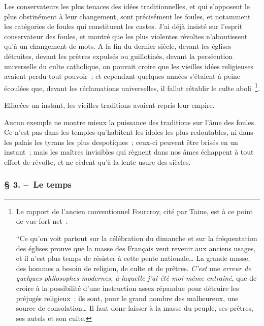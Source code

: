 \documentclass[french,twoside]{book} %
\begin{document}
Les conservateurs les plus tenaces des idées traditionnelles, et qui s’opposent le plus obstinément à leur changement, sont précisément les foules, et notamment les catégories de foules qui constituent les castes. J’ai déjà insisté sur l’esprit conservateur des foules, et montré que les plus violentes révoltes n’aboutissent qu’à un changement de mots. A la fin du dernier siècle, devant les églises détruites, devant les prêtres expulsés ou guillotinés, devant la persécution universelle du culte catholique, on pouvait croire que les vieilles idées religieuses avaient perdu tout pouvoir ; et cepen­dant quelques années s’étaient à peine écoulées que, devant les réclamations univer­selles, il fallut rétablir le culte aboli \footnote{ \noindent Le rapport de l’ancien conventionnel Fourcroy, cité par Taine, est à ce point de vue fort net :\par
 “Ce qu’on voit partout sur la célébration du dimanche et sur la fréquentation des églises prouve que la masse des Français veut revenir aux anciens usages, et il n’est plus temps de résister à cette pente nationale… La grande masse, des hommes a besoin de religion, de culte et de prêtres. \emph{C’est} une \emph{erreur de quelques philosophes modernes, à laquelle j’ai été moi-même entraîné}, que de croire à la possibilité d’une instruction assez répandue pour détruire les préjugés reli­gieux ; ils sont, pour le grand nombre des malheureux, une source de consolation… Il faut donc laisser à la masse du peuple, ses prêtres, ses autels et son culte.
}.\par
Effacées un instant, les vieilles traditions avaient repris leur empire.\par
Aucun exemple ne montre mieux la puissance des traditions sur l’âme des foules. Ce n’est pas dans les temples qu’habitent les idoles les plus redoutables, ni dans les palais les tyrans les plus despotiques ; ceux-ci peuvent être brisés en un instant ; mais les maîtres in­visibles qui règnent dans nos âmes échappent à tout effort de révolte, et ne cèdent qu’à la lente usure des siècles.
\subsubsection[{§ 3. – Le temps}]{§ 3. – Le temps}
\end{document}
